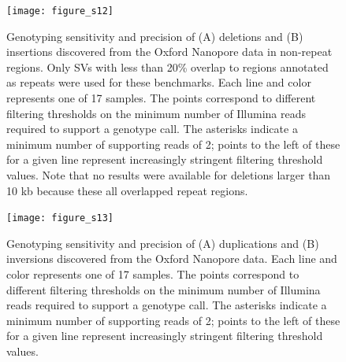 \documentclass[12pt]{article}
\newenvironment{cfigure}
	{\begin{figure} \centering}
	{\end{figure}}
\newenvironment{lsfigure}
	{\begin{landscape} \begin{figure} \centering}
	{\end{figure} \end{landscape}}
\begin{document}
\begin{lsfigure}
		\texttt{[image: figure\_s12]}

		\caption[Sensitivity and precision of Oxford Nanopore deletion and insertion genotyping in non-repeat regions]{
			Genotyping sensitivity and precision of (A) deletions and (B) insertions discovered from the Oxford Nanopore data in non-repeat regions. 
			Only SVs with less than 20\% overlap to regions annotated as repeats were used for these benchmarks. 
			Each line and color represents one of 17 samples. 
		The points correspond to different filtering thresholds on the minimum number of Illumina reads required to support a genotype call.
			The asterisks indicate a minimum number of supporting reads of 2; points to the left of these for a given line represent increasingly stringent filtering threshold values.
			Note that no results were available for deletions larger than 10 kb because these all overlapped repeat regions.
	}

		\label{fig_s12}
\end{lsfigure}

\clearpage%

\begin{cfigure}
	\texttt{[image: figure\_s13]}

	\caption[Sensitivity and precision of Oxford Nanopore duplication and inversion genotyping]{
		Genotyping sensitivity and precision of (A) duplications and (B) inversions discovered from the Oxford Nanopore data. 
		Each line and color represents one of 17 samples. 
		The points correspond to different filtering thresholds on the minimum number of Illumina reads required to support a genotype call.
		The asterisks indicate a minimum number of supporting reads of 2; points to the left of these for a given line represent increasingly stringent filtering threshold values.
	}

	\label{fig_s13}

\end{cfigure}

\clearpage%
\end{document}
